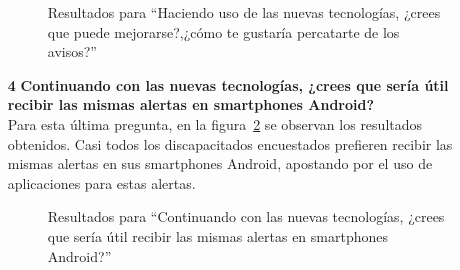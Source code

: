 \begin{itemize}
\begin{figure}[!ht]
                \caption{Resultados para ``Haciendo uso de las nuevas tecnologías, ¿crees que puede mejorarse?,¿cómo te gustaría percatarte de los avisos?''}
                \label{fig:resultados3}
            \end{figure}
        \item[\textbf{4}] \textbf{Continuando con las nuevas tecnologías, ¿crees que sería útil recibir las mismas alertas en smartphones Android?}\\
            Para esta última pregunta, en la figura~\ref{fig:resultados4} se observan los resultados obtenidos. Casi todos los discapacitados encuestados prefieren recibir las mismas alertas en sus smartphones Android, apostando por el uso de aplicaciones para estas alertas.
            \begin{figure}[!ht]
            \centering
                \caption{Resultados para ``Continuando con las nuevas tecnologías, ¿crees que sería útil recibir las mismas alertas en smartphones Android?''}
                \label{fig:resultados4}
            \end{figure}
    \end{itemize}

